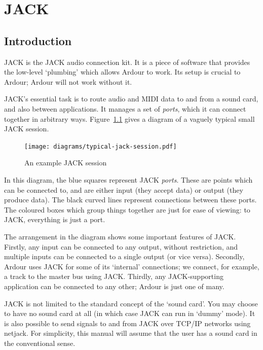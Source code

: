 \documentclass[10pt,a4paper]{book}
\begin{document}
\chapter{JACK}
\label{ch:jack}

\section{Introduction}

JACK is the JACK audio connection kit.  It is a piece of software that
provides the low-level `plumbing' which allows Ardour to work.  Its
setup is crucial to Ardour; Ardour will not work without it.

JACK's essential task is to route audio and MIDI data to and from a
sound card, and also between applications.  It manages a set of
\emph{ports}, which it can connect together in arbitrary ways.
Figure~\ref{fig:typical-jack-session} gives a diagram of a vaguely
typical small JACK session.

\begin{figure}[ht]
\begin{center}
\texttt{[image: diagrams/typical-jack-session.pdf]}
\end{center}
\caption{An example JACK session}
\label{fig:typical-jack-session}
\end{figure}

In this diagram, the blue squares represent JACK \emph{ports}.  These
are points which can be connected to, and are either input (they
accept data) or output (they produce data).  The black curved lines
represent connections between these ports.  The coloured boxes which
group things together are just for ease of viewing: to JACK,
everything is just a port.

The arrangement in the diagram shows some important features of JACK.
Firstly, any input can be connected to any output, without
restriction, and multiple inputs can be connected to a single output
(or vice versa).  Secondly, Ardour uses JACK for some of its
`internal' connections; we connect, for example, a track to the master
bus using JACK\@.  Thirdly, any JACK-supporting application can be
connected to any other; Ardour is just one of many.

\begin{danger}
JACK is not limited to the standard concept of the `sound card'.  You
may choose to have no sound card at all (in which case JACK can run in
`dummy' mode).  It is also possible to send signals to and from JACK
over TCP/IP networks using netjack.  For simplicity, this manual will
assume that the user has a sound card in the conventional sense.
\end{danger}
\end{document}

